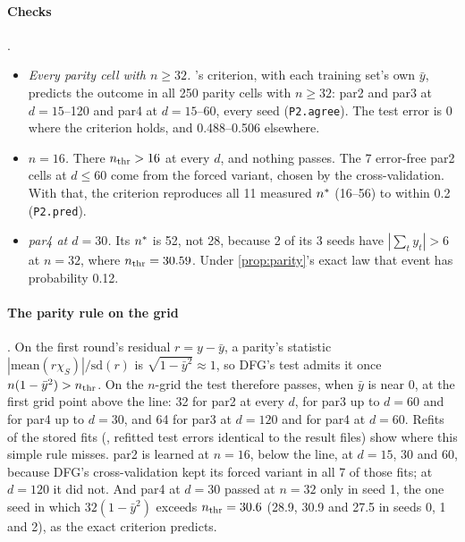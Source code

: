 \paragraph{Checks} .
\begin{itemize}
\item \emph{Every parity cell with $n\ge32$.} 's criterion, with each training set's own $\bar y$, predicts the outcome in all 250 parity cells with $n\ge32$: par2 and par3 at $d=15$--120 and par4 at $d=15$--60, every seed (\texttt{P2.agree}). The test error is 0 where the criterion holds, and 0.488--0.506 elsewhere.
\item \emph{$n=16$.} There $n_{\rm thr}>16$ at every $d$, and nothing passes. The 7 error-free par2 cells at $d\le60$ come from the forced variant, chosen by the cross-validation. With that, the criterion reproduces all 11 measured $n^{*}$ (16--56) to within 0.2 (\texttt{P2.pred}).
\item \emph{par4 at $d=30$.} Its $n^{*}$ is 52, not 28, because 2 of its 3 seeds have $|\sum_ty_t|>6$ at $n=32$, where $n_{\rm thr}=30.59$. Under \cref{prop:parity}'s exact law that event has probability 0.12.
\end{itemize}

\paragraph{The parity rule on the grid} . On the first round's residual $r=y-\bar y$, a parity's statistic $|\mathrm{mean}(r\chi_S)|/\mathrm{sd}(r)$ is $\sqrt{1-\bar y^2}\approx1$, so DFG's test admits it once $n(1-\bar y^2)>n_{\rm thr}$. On the $n$-grid the test therefore passes, when $\bar y$ is near 0, at the first grid point above the line: 32 for par2 at every $d$, for par3 up to $d=60$ and for par4 up to $d=30$, and 64 for par3 at $d=120$ and for par4 at $d=60$. Refits of the stored fits (, refitted test errors identical to the result files) show where this simple rule misses. par2 is learned at $n=16$, below the line, at $d=15$, 30 and 60, because DFG's cross-validation kept its forced variant in all 7 of those fits; at $d=120$ it did not. And par4 at $d=30$ passed at $n=32$ only in seed 1, the one seed in which $32(1-\bar y^2)$ exceeds $n_{\rm thr}=30.6$ (28.9, 30.9 and 27.5 in seeds 0, 1 and 2), as the exact criterion predicts.

